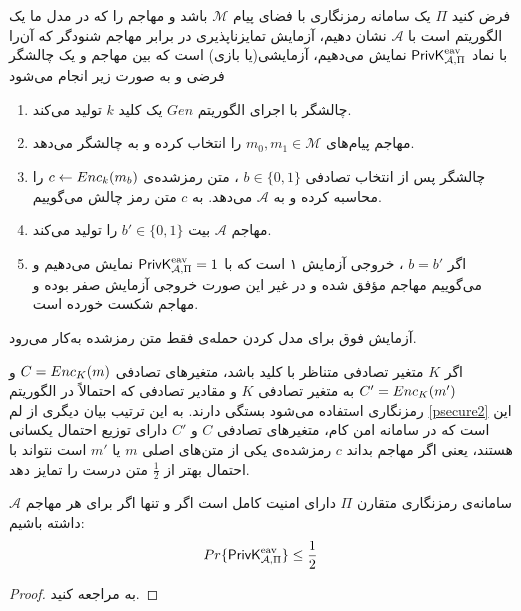 \begin{definition}
	فرض کنید 
	$\Pi$
	یک سامانه‌  رمزنگاری با فضای پیام 
	$\mathcal{M}$
	باشد و مهاجم را که در مدل ما یک الگوریتم است با  
	$\mathcal{A}$
	نشان دهیم، آزمایش تمایزناپذیری در برابر مهاجم شنودگر که آن‌را با نماد 
	$\mathsf{PrivK}_{\mathcal{A},\Pi}^{\textup{eav}}$
	نمایش می‌دهیم، آزمایشی(یا بازی) است که بین مهاجم و یک چالشگر فرضی و به صورت زیر انجام می‌شود
	\begin{enumerate}
		\item
		چالشگر با اجرای الگوریتم 
		$Gen$
		یک کلید 
		$k$
		 تولید می‌کند.
		 \item
		 مهاجم پیام‌های 
		 $m_0, m_{1}\in\mathcal{M}$
		 را انتخاب کرده و به چالشگر می‌دهد.
		 \item
		 چالشگر پس از انتخاب تصادفی 
		 $b\in\{0,1\}$
		 ، متن رمز‌شده‌ی 
		 $c\leftarrow Enc_{k}(m_{b})$
		 را محاسبه کرده و به 
		 $\mathcal{A}$
		 می‌دهد. به 
		 $c$
		 متن رمز چالش می‌گوییم.
		 \item
		 مهاجم 
		 $\mathcal{A}$
		 بیت 
		 $b'\in\{0,1\}$
		 را تولید می‌کند.
		 \item
		 اگر 
		 $b = b'$
، خروجی آزمایش ۱ است که با 
		 $\mathsf{PrivK}_{\mathcal{A},\Pi}^{\textup{eav}} = 1$
		 نمایش می‌دهیم و می‌گوییم مهاجم مؤفق شده و در غیر این صورت خروجی آزمایش صفر بوده و مهاجم شکست خورده است. 
	\end{enumerate}
\end{definition}
آزمایش فوق برای مدل کردن حمله‌ی فقط متن رمزشده به‌کار می‌رود.  
\begin{remark}
	اگر 
	$K$
	متغیر تصادفی متناظر با کلید باشد، متغیرهای تصادفی 
	${\small C = Enc_{K}(m)}$
	و
	${\small C' = Enc_{K}(m')}$
	به متغیر تصادفی 
	$K$
	و مقادیر تصادفی که احتمالاً در الگوریتم رمزنگاری استفاده می‌شود بستگی دارند. به این ترتیب بیان دیگری از لم 
	\ref{psecure2}
	این است که در سامانه‌ امن کام،  متغیرهای تصادفی 
	$C$
	و
	$C'$
	دارای توزیع احتمال یکسانی هستند،  یعنی اگر مهاجم بداند 
	$c$
	رمز‌شده‌ی یکی از متن‌های اصلی 
	$m$
	یا 
	$m'$
	است نتواند با احتمال بهتر از
	$\frac{1}{2}$
	متن درست را تمایز دهد.
\end{remark}

\begin{lemma}
	سامانه‌ی رمزنگاری متقارن 
	$\Pi$
	دارای امنیت کامل است اگر و تنها اگر برای هر مهاجم 
	$\mathcal{A}$
	داشته باشیم: 
	$$Pr\{\mathsf{PrivK}_{\mathcal{A},\Pi}^{\textup{eav}}\} \leq \frac{1}{2}$$
	\begin{proof}
به 
\cite{katz2014introduction}
مراجعه کنید.
	\end{proof}
\end{lemma}

